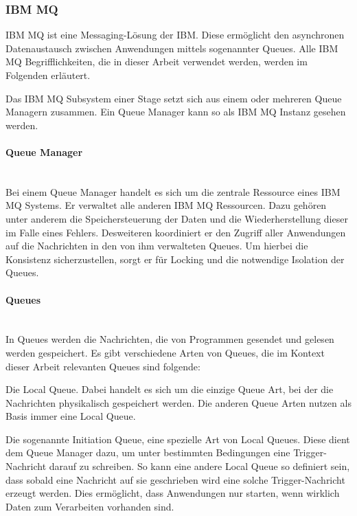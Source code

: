 \subsubsection{IBM MQ}\label{sec:mq}
IBM MQ ist eine Messaging-Lösung der IBM.
Diese ermöglicht den asynchronen Datenaustausch zwischen Anwendungen mittels sogenannter Queues.
Alle IBM MQ Begrifflichkeiten, die in dieser Arbeit verwendet werden, werden im Folgenden erläutert.
\cite{Aranha.2013}

Das IBM MQ Subsystem einer Stage setzt sich aus einem oder mehreren Queue Managern zusammen.
Ein Queue Manager kann so als IBM MQ Instanz gesehen werden.

\paragraph{Queue Manager}~\\
Bei einem Queue Manager handelt es sich um die zentrale Ressource eines IBM MQ Systems.
Er verwaltet  alle anderen IBM MQ Ressourcen.
Dazu gehören unter anderem die Speichersteuerung der Daten und die Wiederherstellung dieser im Falle eines Fehlers.
Desweiteren koordiniert er den Zugriff aller Anwendungen auf die Nachrichten in den von ihm verwalteten Queues.
Um hierbei die Konsistenz sicherzustellen, sorgt er für Locking und die notwendige Isolation der Queues.
\cite{Aranha.2013}

\paragraph{Queues}~\\
In Queues werden die Nachrichten, die von Programmen gesendet und gelesen werden gespeichert.
Es gibt verschiedene Arten von Queues, die im Kontext dieser Arbeit relevanten Queues sind folgende:

Die Local Queue.
Dabei handelt es sich um die einzige Queue Art, bei der die Nachrichten physikalisch gespeichert werden.
Die anderen Queue Arten nutzen als Basis immer eine Local Queue.

Die sogenannte \glqq Initiation Queue\grqq, eine spezielle Art von Local Queues.
Diese dient dem Queue Manager dazu, um unter bestimmten Bedingungen eine Trigger-Nachricht darauf zu schreiben.
So kann eine andere Local Queue so definiert sein, dass sobald eine Nachricht auf sie geschrieben wird eine solche Trigger-Nachricht erzeugt werden.
Dies ermöglicht, dass Anwendungen nur starten, wenn wirklich Daten zum Verarbeiten vorhanden sind.
\cite{Aranha.2013}

